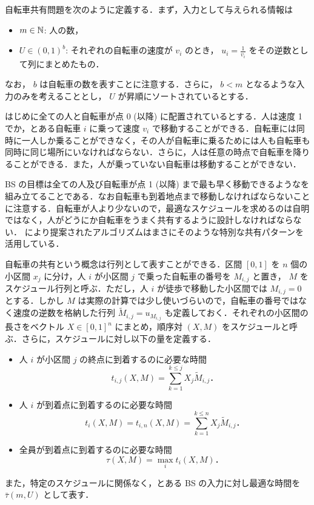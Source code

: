 自転車共有問題を次のように定義する\parencite{czyzowicz}．まず，入力として与えられる情報は
\begin{itemize}
\item $m \in \mathbb{N}$: 人の数，
\item $U \in (0, 1)^{b}$: それぞれの自転車の速度が $v_i$ のとき， $u_i = \frac{1}{v_i}$ をその逆数として列にまとめたもの．
\end{itemize}
なお， $b$ は自転車の数を表すことに注意する．さらに， $b < m$ となるような入力のみを考えることとし，  $U$ が昇順にソートされているとする．

はじめに全ての人と自転車が点 0 (以降) に配置されているとする．人は速度 1 でか，とある自転車 $i$ に乗って速度 $v_i$ で移動することができる．自転車には同時に一人しか乗ることができなく，その人が自転車に乗るためには人も自転車も同時に同じ場所にいなければならない．さらに，人は任意の時点で自転車を降りることができる．また，人が乗っていない自転車は移動することができない．

BS の目標は全ての人及び自転車が点 1 (以降) まで最も早く移動できるようなを組み立てることである．なお自転車も到着地点まで移動しなければならないことに注意する．自転車が人より少ないので，最適なスケジュールを求めるのは自明ではなく，人がどうにか自転車をうまく共有するように設計しなければならない． \textcite{czyzowicz} により提案されたアルゴリズムはまさにそのような特別な共有パターンを活用している．

自転車の共有という概念は行列として表すことができる．区間 $[0, 1]$ を $n$ 個の小区間 $x_j$ に分け，人 $i$ が小区間 $j$ で乗った自転車の番号を $M_{i,j}$ と置き， $M$ をスケジュール行列と呼ぶ．ただし，人 $i$ が徒歩で移動した小区間では $M_{i,j} = 0$ とする．しかし $M$ は実際の計算では少し使いづらいので，自転車の番号ではなく速度の逆数を格納した行列 $\widetilde{M}_{i, j} = u_{M_{i, j}}$ も定義しておく．それぞれの小区間の長さをベクトル $X \in [0, 1]^{n}$ にまとめ，順序対 $(X, M)$ をスケジュールと呼ぶ．さらに，スケジュールに対し以下の量を定義する．
\begin{itemize}
  \item 人 $i$ が小区間 $j$ の終点に到着するのに必要な時間
  \[
    t_{i,j}(X, M) = \sum_{k = 1}^{k \leq j} X_j \widetilde M_{i, j}．
  \]
\item 人 $i$ が到着点に到着するのに必要な時間
  \[
    t_i(X, M) = t_{i,n}(X, M) = \sum_{k = 1}^{k \leq n} X_j \widetilde M_{i, j}．
  \]
\item 全員が到着点に到着するのに必要な時間
  \[
    \tau(X, M) = \max_{i} t_i(X, M)．
  \]
\end{itemize}
また，特定のスケジュールに関係なく，とある BS の入力に対し最適な時間を $\bar\tau(m, U)$ として表す．

